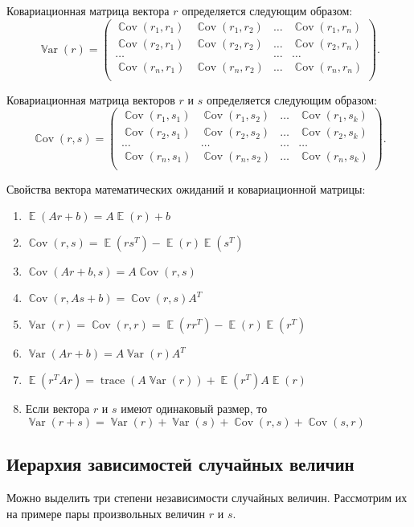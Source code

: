 \documentclass[12pt]{article}
\DeclareMathOperator{\Cov}{\mathbb{C}ov}
\DeclareMathOperator{\Var}{\mathbb{V}ar}
\DeclareMathOperator{\E}{\mathbb{E}}
\DeclareMathOperator{\trace}{trace}
\begin{document}
Ковариационная матрица вектора $r$ определяется следующим образом:
\[
\Var(r) = \begin{pmatrix}
	\Cov(r_1,r_1) & \Cov(r_1,r_2) & \dots & \Cov(r_1,r_n) \\
	\Cov(r_2,r_1) & \Cov(r_2,r_2) & \dots & \Cov(r_2,r_n) \\
        \dots & & \dots & \dots\\
        \Cov(r_n,r_1) & \Cov(r_n,r_2) & \dots & \Cov(r_n,r_n) \\
      \end{pmatrix}.
\]

Ковариационная матрица векторов $r$ и $s$ определяется следующим образом:
\[
\Cov(r,s) = \begin{pmatrix}
	\Cov(r_1,s_1) & \Cov(r_1,s_2) & \dots & \Cov(r_1,s_k) \\
	\Cov(r_2,s_1) & \Cov(r_2,s_2) & \dots & \Cov(r_2,s_k) \\
        \dots & \dots & \dots & \dots\\
        \Cov(r_n,s_1) & \Cov(r_n,s_2) & \dots & \Cov(r_n,s_k) \\
      \end{pmatrix}.
\]

Свойства вектора математических ожиданий и ковариационной матрицы:
\begin{enumerate}
    \item $\E(Ar+b) = A\E(r)+b$
    \item $\Cov(r,s) = \E(rs^T)-\E(r)\E(s^T)$
    \item $\Cov(Ar+b,s) = A\Cov(r,s)$
    \item $\Cov(r,As+b) = \Cov(r,s)A^T$
    \item $\Var(r)=\Cov(r,r) = \E(rr^T)-\E(r)\E(r^T)$
    \item $\Var(Ar+b) = A\Var(r)A^T$
    \item $\E(r^T Ar) = \trace(A\Var(r))+\E(r^T) A\E(r)$  
    \item Если вектора $r$ и $s$ имеют одинаковый размер, то
    $\Var(r + s) = \Var(r) + \Var(s) + \Cov(r, s) + \Cov(s, r)$
\end{enumerate}

\subsection{Иерархия зависимостей случайных величин}

Можно выделить три степени независимости случайных величин. 
Рассмотрим их на примере пары произвольных величин $r$ и $s$.
\end{document}
